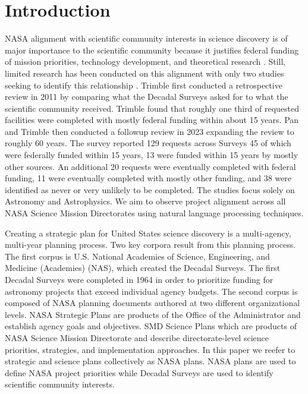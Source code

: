 \documentclass[preprint,12pt]{elsarticle}
\begin{document}


\section{Introduction}

NASA alignment with scientific community interests in science discovery is of major importance to the scientific community because it justifies federal funding of mission priorities, technology development, and theoretical research \cite{nasa_smd_hearing_2024}. Still, limited research has been conducted on this alignment with only two studies seeking to identify this relationship \cite{Trimble2011} \cite {pan2023seven_Decadals}. Trimble first conducted a retrospective review in 2011 by comparing what the Decadal Surveys asked for to what the scientific community received. Trimble found that roughly one third of requested facilities were completed with mostly federal funding within about 15 years. Pan and Trimble then conducted a followup review in 2023 expanding the review to roughly 60 years.  The survey reported 129 requests across Surveys 45 of which were federally funded within 15 years, 13 were funded within 15 years by mostly other sources. An additional 20 requests were eventually completed with federal funding, 11 were eventually completed with mostly other funding, and 38 were identified as never or very unlikely to be completed. The studies focus solely on Astronomy and Astrophysics. We aim to observe project alignment across all NASA Science Mission Directorates using natural language processing techniques. 

Creating a strategic plan for United States science discovery is a multi-agency, multi-year planning process. Two key corpora result from this planning process. The first corpus is U.S. National Academies of Science, Engineering, and Medicine (Academies) (NAS), which created the Decadal Surveys. The first Decadal Surveys were completed in 1964 in order to prioritize funding for astronomy projects that exceed individual agency budgets\cite{Academies2015_lessons}. The second corpus is composed of NASA planning documents authored at two different organizational levels. NASA Strategic Plans are products of the Office of the Administrator and establish agency goals and objectives\cite{WhiteHouse2021_space_priorities_framework}. SMD Science Plans which are products of NASA Science Mission Directorate and describe directorate-level science priorities, strategies, and implementation approaches.\cite{SMD_2025} In this paper we reefer to strategic and science plans collectively as NASA plans. NASA plans are used to define NASA project priorities while Decadal Surveys are used to identify scientific community interests.
\end{document}
